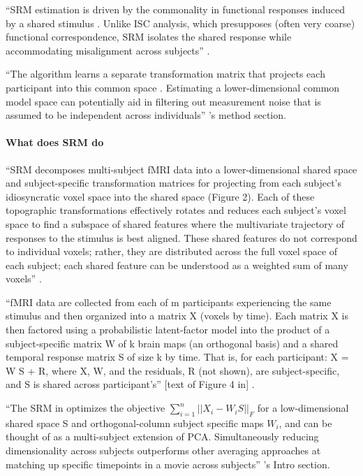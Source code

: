 %
``SRM estimation is driven by the commonality in functional responses induced by
a shared stimulus . Unlike ISC analysis, which presupposes (often very coarse)
functional correspondence, SRM isolates the shared response while accommodating
misalignment across subjects'' \citep{kumar2020brainiak}.

%
``The algorithm learns a separate transformation matrix that projects each
participant into this common space \citep{chen2015reduced}. Estimating a
lower-dimensional common model space can potentially aid in filtering out
measurement noise that is assumed to be independent across individuals''
\citep{chang2021endogenous}'s method section.
%


\paragraph{What does SRM do}
%
``SRM decomposes multi-subject fMRI data into a lower-dimensional shared space
and subject-specific transformation matrices for projecting from each subject's
idiosyncratic voxel space into the shared space (Figure 2). Each of these
topographic transformations effectively rotates and reduces each subject's voxel
space to find a subspace of shared features where the multivariate trajectory of
responses to the stimulus is best aligned. These shared features do not
correspond to individual voxels; rather, they are distributed across the full
voxel space of each subject; each shared feature can be understood as a weighted
sum of many voxels'' \citep{kumar2020brainiak}.


%
``fMRI data are collected from each of m participants experiencing the same
stimulus and then organized into a matrix X (voxels by time). Each matrix X is
then factored using a probabilistic latent-factor model into the product of a
subject-specific matrix W of k brain maps (an orthogonal basis) and a shared
temporal response matrix S of size k by time. That is, for each participant: X =
W S + R, where X, W, and the residuals, R (not shown), are subject-specific, and
S is shared across participant's'' [text of Figure 4 in]
\citep{cohen2017computational}.

%
``The SRM in \citet{chen2015reduced} optimizes the objective
$\sum_{i=1}^{n}||X_{i}-W_{i}S||_{F}$ for a low-dimensional shared space S and
orthogonal-column subject specific maps $W_{i}$, and can be thought of as a
multi-subject extension of PCA.  Simultaneously reducing dimensionality across
subjects outperforms other averaging approaches at matching up specific
timepoints in a movie across subjects'' \citep{vodrahalli2018mapping}'s Intro
section.

